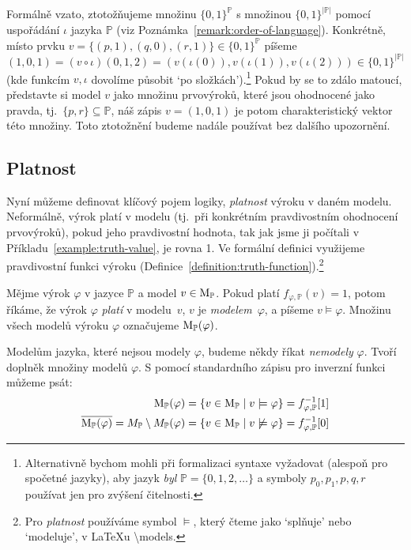 \begin{remark}
Formálně vzato, ztotožňujeme množinu $\{0,1\}^\mathbb P$ s množinou $\{0,1\}^{|\mathbb P|}$ pomocí uspořádání $\iota$ jazyka $\mathbb P$ (viz Poznámka~\ref{remark:order-of-language}). Konkrétně, místo prvku $v=\{(p,1),(q,0),(r,1)\}\in\{0,1\}^\mathbb P$ píšeme $(1,0,1)=(v\circ\iota)(0,1,2)=(v(\iota(0)),v(\iota(1)),v(\iota(2)))\in\{0,1\}^{|\mathbb P|}$ (kde funkcím $v,\iota$ dovolíme působit `po složkách').\footnote{Alternativně bychom mohli při formalizaci syntaxe vyžadovat (alespoň pro spočetné jazyky), aby jazyk \emph{byl} $\mathbb P=\{0,1,2,\dots\}$ a symboly $p_0,p_1,p,q,r$ používat jen pro zvýšení čitelnosti.} Pokud by se to zdálo matoucí, představte si model $v$ jako množinu prvovýroků, které jsou ohodnocené jako pravda, tj.\ $\{p,r\}\subseteq\mathbb P$, náš zápis $v=(1,0,1)$ je potom charakteristický vektor této množiny. Toto ztotožnění budeme nadále používat bez dalšího upozornění. 
\end{remark}


\subsection{Platnost}

Nyní můžeme definovat klíčový pojem logiky, \emph{platnost} výroku v daném modelu. Neformálně, výrok platí v modelu (tj.\ při konkrétním pravdivostním ohodnocení prvovýroků), pokud jeho pravdivostní hodnota, tak jak jsme ji počítali v Příkladu~\ref{example:truth-value}, je rovna 1. Ve formální definici využijeme pravdivostní funkci výroku (Definice~\ref{definition:truth-function}).\footnote{Pro \emph{platnost} používáme symbol $\models$, který čteme jako `splňuje' nebo `modeluje', v {\LaTeX}u {\textbackslash}models.}

\begin{definition}\label{definition:validity}
    Mějme výrok $\varphi$ v jazyce $\mathbb P$ a model $v\in\operatorname{M}_\mathbb P$. Pokud platí $f_{\varphi,\mathbb P}(v)=1$, potom říkáme, že výrok $\varphi$ \emph{platí} v modelu~$v$, $v$ je \emph{modelem}~$\varphi$, a píšeme $v\models\varphi$. Množinu všech modelů výroku $\varphi$ označujeme $\operatorname{M}_\mathbb P(\varphi)$.
\end{definition}
Modelům jazyka, které nejsou modely $\varphi$, budeme někdy říkat \emph{nemodely} $\varphi$. Tvoří doplněk množiny modelů $\varphi$. S pomocí standardního zápisu pro inverzní funkci můžeme psát:
\begin{align*}
    \operatorname{M}_\mathbb P(\varphi)&=\{v\in\operatorname{M}_\mathbb P\mid v\models \varphi\}=f_{\varphi,\mathbb P}^{-1}[1]\\
    \overline{\operatorname{M}_\mathbb P(\varphi)}=M_\mathbb P\setminus M_\mathbb P(\varphi)&=\{v\in\operatorname{M}_\mathbb P\mid v\not\models \varphi\}=f_{\varphi,\mathbb P}^{-1}[0]
\end{align*}

